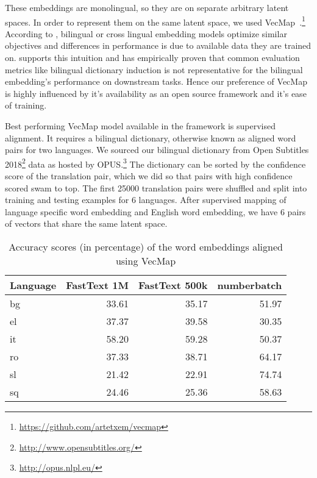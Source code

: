 These embeddings are monolingual, so they are on separate arbitrary latent spaces.
In order to represent them on the same latent space, we used VecMap~\cite{artetxe_robust_2018,artetxe_generalizing_2018,artetxe_learning_2017,artetxe_learning_2016}.\footnote{\url{https://github.com/artetxem/vecmap}}
According to \textcite{ruder_survey_2017}, bilingual or cross lingual embedding models optimize similar objectives and differences in performance is due to available data they are trained on.
\textcite{glavas_how_2019} supports this intuition and has empirically proven that common evaluation metrics like bilingual dictionary induction is not representative for the bilingual embedding's performance on downstream tasks.
Hence our preference of VecMap is highly influenced by it's availability as an open source framework and it's ease of training.

Best performing VecMap model available in the framework is supervised alignment.
It requires a bilingual dictionary, otherwise known as aligned word pairs for two languages.
We sourced our bilingual dictionary from Open Subtitles 2018\footnote{\url{http://www.opensubtitles.org/}} data as hosted by OPUS.\footnote{\url{http://opus.nlpl.eu/}}
The dictionary can be sorted by the confidence score of the translation pair, which we did so that pairs with high confidence scored swam to top.
The first 25000 translation pairs were shuffled and split into training and testing examples for 6 languages.
After supervised mapping of language specific word embedding and English word embedding, we have 6 pairs of vectors that share the same latent space.

\begin{table}[htbp]
    \centering
    \begin{tabular}{lrrr}
        \toprule
        \textbf{Language} & \textbf{FastText 1M} & \textbf{FastText 500k} & \textbf{numberbatch} \\
        \midrule
        bg & 33.61 & 35.17 & 51.97 \\
        el & 37.37 & 39.58 & 30.35 \\
        it & 58.20 & 59.28 & 50.37 \\
        ro & 37.33 & 38.71 & 64.17 \\
        sl & 21.42 & 22.91 & 74.74 \\
        sq & 24.46 & 25.36 & 58.63 \\
        \bottomrule
    \end{tabular}
    \caption{Accuracy scores (in percentage) of the word embeddings aligned using VecMap}%
    \label{tab:accuracy_results}
\end{table}

